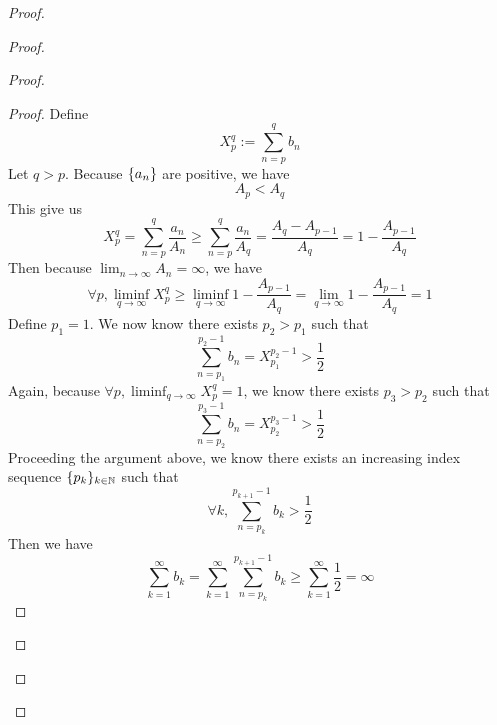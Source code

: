 \documentclass{report}
\begin{document}
\begin{proof}
\begin{proof}
\begin{proof}
\begin{proof}
Define
\begin{equation}
X^q_p:=\sum_{n=p}^q b_n
\end{equation}
Let $q>p$. Because  $\{ a_n \}$ are positive, we have 
\begin{equation}
A_p<A_q
\end{equation}
This give us
\begin{equation}
X_p^q=\sum_{n=p}^q \frac{a_n}{A_n}\geq \sum_{n=p}^q \frac{a_n}{A_q}=\frac{A_q-A_{p-1}}{A_q}=1-\frac{A_{p-1}}{A_q}
\end{equation}
Then because $\lim_{n\to\infty}A_n=\infty$, we have
\begin{equation}
\forall p,\liminf_{q\to\infty}X_p^q\geq \liminf_{q\to\infty} 1-\frac{A_{p-1}}{A_q} =\lim_{q\to\infty}1-\frac{A_{p-1}}{A_q}=1
\end{equation}
Define $p_1=1$. We now know there exists $p_2>p_1$ such that
\begin{equation}
\sum_{n=p_1}^{p_2-1} b_n= X_{p_1}^{p_2-1}>\frac{1}{2}
\end{equation}
Again, because $\forall p,\liminf_{q\to\infty} X_p^q=1$, we know there exists $p_3>p_2$ such that
 \begin{equation}
\sum_{n=p_2}^{p_3-1} b_n=X_{p_2}^{p_3-1} >\frac{1}{2}
\end{equation}
Proceeding the argument above, we know there exists an increasing index sequence $\{ p_k \}_{k\in\mathbb{N}}$ such that 
\begin{equation}
\forall k,\sum_{n=p_k}^{p_{k+1}-1} b_k>\frac{1}{2}
\end{equation}
Then we have
\begin{equation}
\sum_{k=1}^\infty b_k=  \sum_{k=1}^\infty \sum_{n=p_k}^{p_{k+1}-1} b_k\geq \sum_{k=1}^\infty \frac{1}{2}=\infty
\end{equation}

\end{proof}


\end{proof}
\end{proof}
\end{proof}
\end{document}
